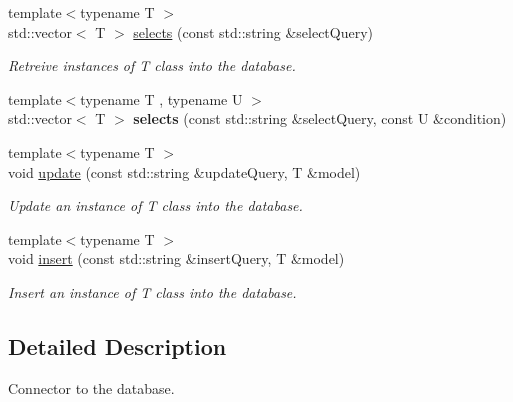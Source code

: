 \begin{DoxyCompactItemize}
\item 
{\footnotesize template$<$typename T $>$ }\\std\-::vector$<$ T $>$ \hyperlink{class_database_connector_a6a36b1ea105eec24a17803cc6343861a}{selects} (const std\-::string \&select\-Query)
\begin{DoxyCompactList}\small\item\em Retreive instances of T class into the database. \end{DoxyCompactList}\item 
\hypertarget{class_database_connector_a85b54e4015558e207a5f5bc319959d01}{{\footnotesize template$<$typename T , typename U $>$ }\\std\-::vector$<$ T $>$ {\bfseries selects} (const std\-::string \&select\-Query, const U \&condition)}\label{class_database_connector_a85b54e4015558e207a5f5bc319959d01}

\item 
{\footnotesize template$<$typename T $>$ }\\void \hyperlink{class_database_connector_a9188c7ca1b02f42cb77aa8bec3bbe374}{update} (const std\-::string \&update\-Query, T \&model)
\begin{DoxyCompactList}\small\item\em Update an instance of T class into the database. \end{DoxyCompactList}\item 
{\footnotesize template$<$typename T $>$ }\\void \hyperlink{class_database_connector_ac56b1888a8047d14fa18ea3df34c4f9a}{insert} (const std\-::string \&insert\-Query, T \&model)
\begin{DoxyCompactList}\small\item\em Insert an instance of T class into the database. \end{DoxyCompactList}\end{DoxyCompactItemize}


\subsection{Detailed Description}
Connector to the database. 

